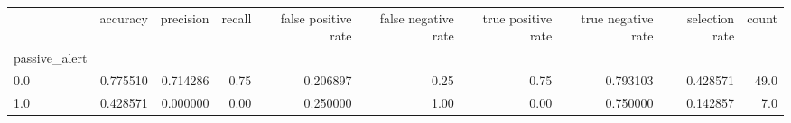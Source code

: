 \begin{tabular}{lrrrrrrrrr}
\toprule
{} &  accuracy &  precision &  recall &  false positive rate &  false negative rate &  true positive rate &  true negative rate &  selection rate &  count \\
passive\_alert &           &            &         &                      &                      &                     &                     &                 &        \\
\midrule
0.0           &  0.775510 &   0.714286 &    0.75 &             0.206897 &                 0.25 &                0.75 &            0.793103 &        0.428571 &   49.0 \\
1.0           &  0.428571 &   0.000000 &    0.00 &             0.250000 &                 1.00 &                0.00 &            0.750000 &        0.142857 &    7.0 \\
\bottomrule
\end{tabular}
